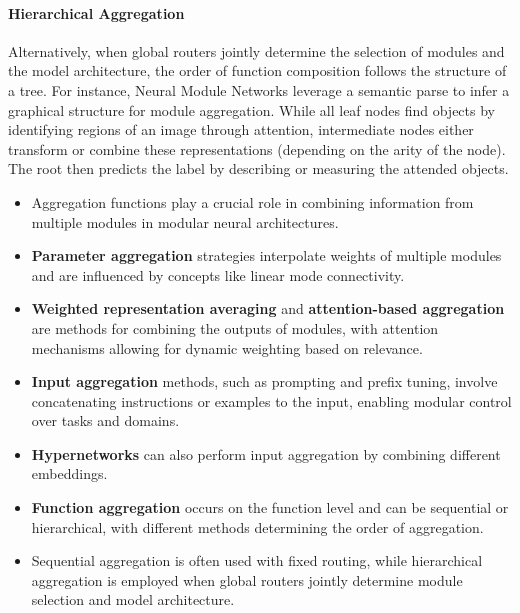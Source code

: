\documentclass[10pt]{article} %
\begin{document}
\paragraph*{Hierarchical Aggregation} Alternatively, when global routers jointly determine the selection of modules and the model architecture, the order of function composition follows the structure of a tree.
For instance, Neural Module Networks \citep{andreas2016nmn} leverage a semantic parse to infer a graphical structure for module aggregation. While all leaf nodes find objects by identifying regions of an image through attention, intermediate nodes either transform or combine these representations (depending on the arity of the node). The root then predicts the label by describing or measuring the attended objects.




\begin{tcolorbox}{%
    \begin{itemize}
      \setlength\itemsep{-.1em}
        \item Aggregation functions play a crucial role in combining information from multiple modules in modular neural architectures.
        \item \textbf{Parameter aggregation} strategies interpolate weights of multiple modules and are influenced by concepts like linear mode connectivity.
        \item \textbf{Weighted representation averaging} and \textbf{attention-based aggregation} are methods for combining the outputs of modules, with attention mechanisms allowing for dynamic weighting based on relevance.
        \item \textbf{Input aggregation} methods, such as prompting and prefix tuning, involve concatenating instructions or examples to the input, enabling modular control over tasks and domains.
        \item \textbf{Hypernetworks} can also perform input aggregation by combining different embeddings.

        
        
        \item \textbf{Function aggregation} occurs on the function level and can be sequential or hierarchical, with different methods determining the order of aggregation.
        \item Sequential aggregation is often used with fixed routing, while hierarchical aggregation is employed when global routers jointly determine module selection and model architecture.
    \end{itemize}
}%
\end{tcolorbox}
\end{document}
